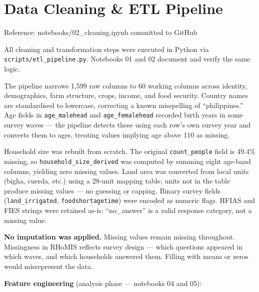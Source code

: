 \documentclass[11pt,a4paper]{article}
\newcommand{\nb}[1]{\vspace{2pt}\begin{refbox}Reference: #1\end{refbox}\vspace{3pt}}
\begin{document}
\newpage

\section{Data Cleaning \& ETL Pipeline}

\nb{notebooks/02\_cleaning.ipynb committed to GitHub}

All cleaning and transformation steps were executed in Python via \texttt{scripts/etl\_pipeline.py}. Notebooks 01 and 02 document and verify the same logic.

The pipeline narrows 1,599 raw columns to 60 working columns across identity, demographics, farm structure, crops, income, and food security. Country names are standardised to lowercase, correcting a known misspelling of ``philippines.'' Age fields in \texttt{age\_malehead} and \texttt{age\_femalehead} recorded birth years in some survey waves — the pipeline detects these using each row's own survey year and converts them to ages, treating values implying age above 110 as missing.

Household size was rebuilt from scratch. The original \texttt{count\_people} field is 49.4\% missing, so \texttt{household\_size\_derived} was computed by summing eight age-band columns, yielding zero missing values. Land area was converted from local units (bigha, cuerda, etc.) using a 28-unit mapping table; units not in the table produce missing values — no guessing or capping. Binary survey fields (\texttt{land\_irrigated}, \texttt{foodshortagetime}) were encoded as numeric flags. HFIAS and FIES strings were retained as-is; ``no\_answer'' is a valid response category, not a missing value.

\textbf{No imputation was applied.} Missing values remain missing throughout. Missingness in RHoMIS reflects survey design — which questions appeared in which waves, and which households answered them. Filling with means or zeros would misrepresent the data.

\textbf{Feature engineering} (analysis phase — notebooks 04 and 05):
\end{document}
